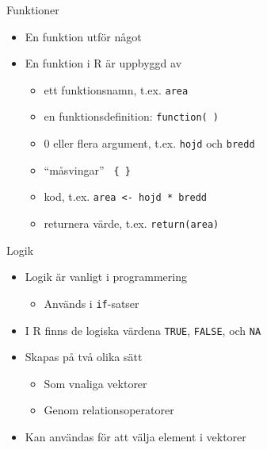 \documentclass[
  11pt,
  ignorenonframetext,
]{beamer}
\providecommand{\tightlist}{%
  \setlength{\itemsep}{0pt}\setlength{\parskip}{0pt}}
\begin{document}
\begin{frame}{Funktioner}
\protect\hypertarget{funktioner}{}
\begin{itemize}
\tightlist
\item
  En funktion utför något
\item
  En funktion i R är uppbyggd av

  \begin{itemize}
  \tightlist
  \item
    ett funktionsnamn, t.ex. \texttt{area}
  \item
    en funktionsdefinition: \texttt{function( )}
  \item
    0 eller flera argument, t.ex. \texttt{hojd} och \texttt{bredd}
  \item
    ``måsvingar'' \texttt{ \{ \} }
  \item
    kod, t.ex. \texttt{area <- hojd * bredd}
  \item
    returnera värde, t.ex. \texttt{return(area)}
  \end{itemize}
\end{itemize}
\end{frame}

\begin{frame}{Logik}
\protect\hypertarget{logik}{}
\begin{itemize}
\tightlist
\item
  Logik är vanligt i programmering

  \begin{itemize}
  \tightlist
  \item
    Används i \texttt{if}-satser
  \end{itemize}
\item
  I R finns de logiska värdena \texttt{TRUE}, \texttt{FALSE}, och
  \texttt{NA}
\item
  Skapas på två olika sätt

  \begin{itemize}
  \tightlist
  \item
    Som vnaliga vektorer
  \item
    Genom relationsoperatorer
  \end{itemize}
\item
  Kan användas för att välja element i vektorer
\end{itemize}
\end{frame}
\end{document}
